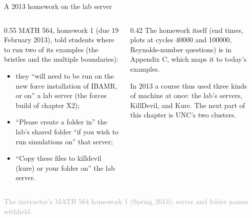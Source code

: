 \documentclass[aspectratio=169,11pt]{beamer}
\newcommand{\sourcecredit}[1]{\vfill\begin{flushright}\tiny\textcolor{DarkGray}{#1}\end{flushright}}
\begin{document}
\begin{frame}{A 2013 homework on the lab server}
\label{fr:hw2013}
\begin{columns}[T,onlytextwidth]
\begin{column}{0.55\textwidth}
\small MATH 564, homework 1 (due 19 February 2013), told students where to run two of its examples (the bristles and the multiple boundaries):
\begin{itemize}\setlength{\itemsep}{3pt}
  \item they ``will need to be run on the new force installation of IBAMR, or on'' a lab server (the forces build of chapter X2);
  \item ``Please create a folder in'' the lab's shared folder ``if you wish to run simulations on'' that server;
  \item ``Copy these files to killdevil (kure) or your folder on'' the lab server.
\end{itemize}
\end{column}
\begin{column}{0.42\textwidth}
\footnotesize The homework itself (end times, plots at cycles 40000 and 100000, Reynolds-number questions) is in Appendix C, which maps it to today's examples.

\vspace{2mm}
In 2013 a course thus used three kinds of machine at once: the lab's servers, KillDevil, and Kure. The next part of this chapter is UNC's two clusters.
\end{column}
\end{columns}
\sourcecredit{The instructor's MATH 564 homework 1 (Spring 2013); server and folder names withheld.}
\end{frame}
\end{document}
